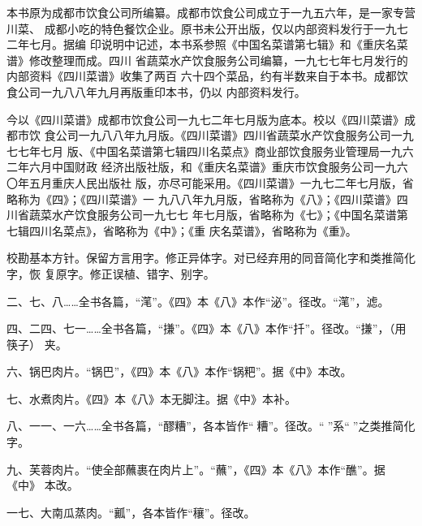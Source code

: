 \begin{list}{}{%
	\setlength{\topsep}{0pt}%
	\setlength{\leftmargin}{.529166mm}%
	\setlength{\rightmargin}{.529166mm}%
	\setlength{\listparindent}{\parindent}%
	\setlength{\itemindent}{\parindent}%
	\setlength{\parsep}{\parskip}%
	\addtolength{\textheight}{2.800060mm}%
}%
\item[]%

\vspace{0\baselineskip plus 1\baselineskip}%

本书原为成都市饮食公司所编纂。成都市饮食公司成立于一九五六年，是一家专营川菜、
成都小吃的特色餐饮企业。原书未公开出版，仅以内部资料发行于一九七二年七月。据编
印说明中记述，本书系参照《中国名菜谱第七辑》和《重庆名菜谱》修改整理而成。四川
省蔬菜水产饮食服务公司编纂，一九七七年七月发行的内部资料《四川菜谱》收集了两百
六十四个菜品，约有半数来自于本书。成都饮食公司一九八八年九月再版重印本书，仍以
内部资料发行。

今以《四川菜谱》成都市饮食公司一九七二年七月版为底本。校以《四川菜谱》成都市饮
食公司一九八八年九月版。《四川菜谱》四川省蔬菜水产饮食服务公司一九七七年七月
版、《中国名菜谱第七辑四川名菜点》商业部饮食服务业管理局一九六二年六月中国财政
经济出版社版，和《重庆名菜谱》重庆市饮食服务公司一九六〇年五月重庆人民出版社
版，亦尽可能采用。《四川菜谱》一九七二年七月版，省略称为《四》；《四川菜谱》一
九八八年九月版，省略称为《八》；《四川菜谱》四川省蔬菜水产饮食服务公司一九七七
年七月版，省略称为《七》；《中国名菜谱第七辑四川名菜点》，省略称为《中》；《重
庆名菜谱》，省略称为《重》。

校勘基本方针。保留方言用字。修正异体字。对已经弃用的同音简化字和类推简化字，恢
复原字。修正误植、错字、别字。

\vspace{1\baselineskip}%

二、七、八……全书各篇，“滗”。《四》本《八》本作“泌”。径改。“滗”，滤。

四、二四、七一……全书各篇，“搛”。《四》本《八》本作“扦”。径改。“搛”，（用筷子）
夹。

六、锅巴肉片。“锅巴”，《四》本《八》本作“锅粑”。据《中》本改。

七、水煮肉片。《四》本《八》本无脚注{\footnotesize{}}。据《中》本补。

八、一一、一六……全书各篇，“醪糟”，各本皆作“𰪿糟”。径改。“𰪿”系“𫃑”之类推简化
字。

九、芙蓉肉片。“使全部蘸裹在肉片上”。“蘸”，《四》本《八》本作“醮”。据《中》
本改。

一七、大南瓜蒸肉。“瓤”，各本皆作“穰”。径改。


\end{list}

